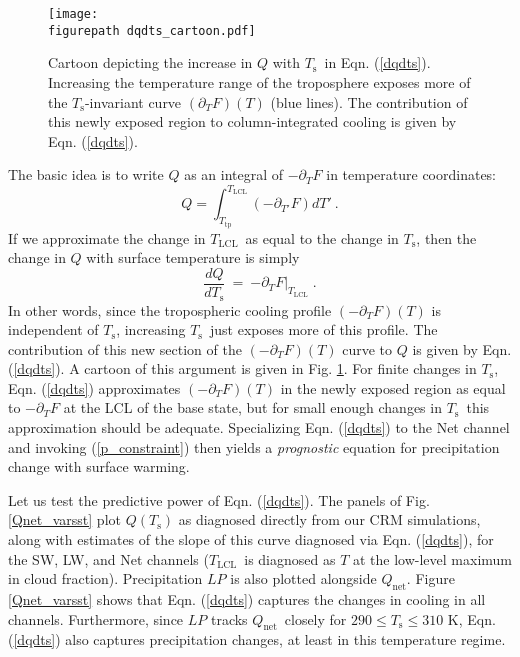\documentclass[9pt,twocolumn,twoside,lineno]{pnas-new}
\newcommand{\beqn}{\begin{equation}}
\newcommand{\eeqn}{\end{equation}}
\newcommand{\eqnref}[1]{(\ref{#1})}
\newcommand{\n}{\nonumber}
\newcommand{\der}[2]{\ensuremath{\frac{d #1}{d #2}}}
\newcommand{\ppt}{\ensuremath{\partial_T}}
\newcommand{\Qnet}{\ensuremath{Q_\mathrm{net}}}
\newcommand{\Ts}{\ensuremath{T_\mathrm{s}}}
\newcommand{\Tlcl}{\ensuremath{T_\mathrm{LCL}}}
\newcommand{\Ttp}{\ensuremath{T_\mathrm{tp}}}
\newcommand{\figurepath}{../../figures/}
\begin{document}
\begin{figure}[t]
	\begin{center}
			\texttt{[image: \\figurepath dqdts\_cartoon.pdf]}
		\caption{Cartoon depicting the increase in $Q$ with \Ts\ in Eqn. \eqnref{dqdts}. Increasing the temperature range of the troposphere  exposes more of the \Ts-invariant curve $(\ppt F)(T)$ (blue lines). The contribution  of this newly exposed region to column-integrated cooling is given by Eqn. \eqnref{dqdts}.
		\label{dqdts_cartoon}
		}
	\end{center}
\end{figure}


	  The basic idea is to write $Q$ as an integral of $-\ppt F$  in temperature coordinates: 
	\beqn
		Q =  \int_{\Ttp}^{\Tlcl} (-\partial_{T'} F) dT' \ . 
		\n
	\eeqn
   If we approximate the change in  \Tlcl\ as equal to the change in \Ts, then the change in $Q$ with surface temperature is  simply
	\beqn
		\der{Q}{\Ts} \ =\  \left.  -\ppt F\right|_{\Tlcl}  \; .
	\label{dqdts}
	\eeqn
In other words, since the tropospheric cooling profile $(-\ppt F)(T)$  is independent of \Ts, increasing \Ts\ just exposes more of this profile.  The contribution of this new section of the $(-\ppt F)(T)$ curve to $Q$ is given by Eqn. \eqnref{dqdts}.  A cartoon of this argument is given in Fig. \ref{dqdts_cartoon}. For finite changes in \Ts, Eqn. \eqnref{dqdts} approximates $(-\ppt F)(T)$ in the newly exposed region as equal to $-\ppt F$ at the LCL of the base state, but for small enough changes in \Ts\ this approximation should be adequate. Specializing Eqn. \eqnref{dqdts} to the Net channel and invoking \eqnref{p_constraint} then yields a \emph{prognostic} equation for precipitation change with surface warming.



Let us test the predictive power of Eqn. \eqnref{dqdts}. The panels of Fig. \ref{Qnet_varsst} plot $Q(\Ts)$ as diagnosed directly from our CRM simulations, along with estimates of the slope of this curve diagnosed via  Eqn. \eqnref{dqdts}, for the SW, LW, and Net  channels (\Tlcl\ is diagnosed as $T$ at the low-level maximum in cloud fraction). Precipitation $LP$ is also plotted alongside $\Qnet$.  Figure \ref{Qnet_varsst} shows that  Eqn. \eqnref{dqdts}  captures the changes in  cooling in all channels. Furthermore, since $LP$ tracks \Qnet\ closely for $290\leq \Ts \leq 310$ K, Eqn. \eqnref{dqdts} also captures precipitation changes, at least in this temperature regime.
\end{document}
